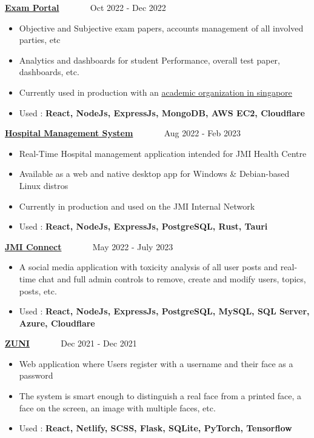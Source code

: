 \documentclass[10pt,a4paper,ragged2e,withhyper]{altacv}
\begin{document}
\begin{paracol}{2}

\large \textcolor{VividPurple}{\href{https://github.com/m3rashid/exam-portal}{\textbf{Exam Portal}}} ~~~~~~ \normalsize \faCalendar Oct 2022 - Dec 2022
\begin{itemize}
  \item Objective and Subjective exam papers, accounts management of all involved parties, etc 
  \item Analytics and dashboards for student Performance, overall test paper, dashboards,  etc.
  \item Currently used in production with an \href{http://leagueonline.sg}{\underline{academic organization in singapore}}
  \item Used : \textcolor{VividPurple}{\textbf{React, NodeJs, ExpressJs, MongoDB, AWS EC2, Cloudflare }}
\end{itemize}

\divider

\large \textcolor{VividPurple}{\href{}{\textbf{Hospital Management System}}} ~~~~~~ \normalsize \faCalendar Aug 2022 - Feb 2023
\begin{itemize}
  \item Real-Time Hospital management application intended for JMI Health Centre
  \item Available as a web and native desktop app for Windows \& Debian-based Linux distros
  \item Currently in production and used on the JMI Internal Network
  \item Used : \textcolor{VividPurple}{\textbf{React, NodeJs, ExpressJs, PostgreSQL, Rust, Tauri }}
\end{itemize}

\divider

\large \textcolor{VividPurple}{\href{https://github.com/m3rashid/DBMS_Project}{\textbf{JMI Connect}}} ~~~~~~ \normalsize \faCalendar May 2022 - July 2023
\begin{itemize}
  \item A social media application with toxicity analysis of all user posts and real-time chat and full admin controls to remove, create and modify users, topics, posts, etc.
  \item Used : \textcolor{VividPurple}{\textbf{React, NodeJs, ExpressJs, PostgreSQL, MySQL, SQL Server, Azure, Cloudflare }}
\end{itemize}
 
\divider

\large \textcolor{VividPurple}{\href{https://github.com/sheikhazhanmohammed/ZUNI}{\textbf{ZUNI}}} ~~~~~~ \normalsize \faCalendar Dec 2021 - Dec 2021
\begin{itemize}
  \item Web application where Users register with a username and their face as a password
  \item The system is smart enough to distinguish a real face from a printed face, a face on the screen, an image with multiple faces, etc.
  \item Used : \textcolor{VividPurple}{\textbf{React, Netlify, SCSS, Flask, SQLite, PyTorch, Tensorflow }}
\end{itemize}


\end{paracol}
\end{document}
